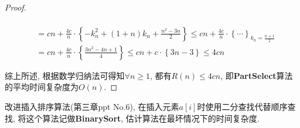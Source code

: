 \documentclass{article}
\begin{document}
\begin{homeworkProblem}
\begin{proof}
\begin{itemize}
\begin{align}
				\\
				&=cn+\frac{4c}{n}\cdot \left\{ -k_{n}^{2}+\left( 1+n \right) k_n+\frac{n^2-3n}{2} \right\} \le cn+\frac{4c}{n}\cdot \left\{ \cdots \right\} _{k_n=\frac{n+1}{2}} \label{最大值}
				\\
				&= cn+\frac{4c}{n}\cdot \left\{ \frac{3n^2-4n+1}{4} \right\} \le cn+c\cdot \left\{ 3n-3 \right\} \le 4cn
			\end{align}
		\end{itemize}
		综上所述, 根据数学归纳法可得知$\forall n\geq 1$, 都有$R(n)\leq 4cn$, 即\textbf{PartSelect}算法的平均时间复杂度为$O(n)$.
	\end{proof}
\end{homeworkProblem}


\begin{homeworkProblem} \label{Problem:BinarySort}
	改进插入排序算法(第三章ppt No.6), 在插入元素$a[i]$时使用二分查找代替顺序查找, 将这个算法记做\textbf{BinarySort}, 估计算法在最坏情况下的时间复杂度. 
	\\

	\solution
	\\


\end{homeworkProblem}
\end{document}
